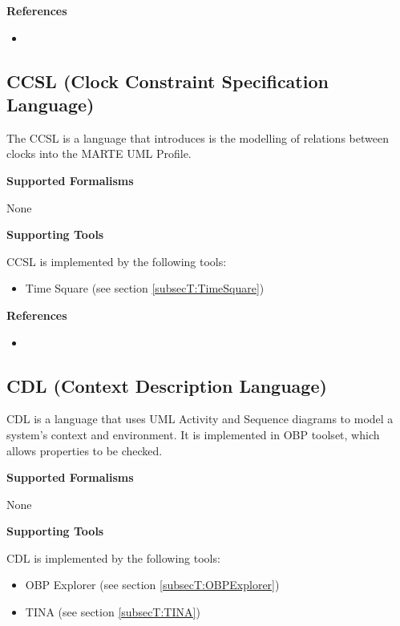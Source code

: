 \textbf{References}
\begin{itemize}
	
\item {}
\end{itemize}



\subsection{CCSL (Clock Constraint Specification Language)}
\label{subsecL:CCSL}


The CCSL is a language that introduces is the modelling of relations between clocks into the MARTE UML Profile.

\textbf{Supported Formalisms}

None


\textbf{Supporting Tools}

CCSL is implemented by the following tools:
\begin{itemize}
	\item Time Square (see section \ref{subsecT:TimeSquare})
\end{itemize}


\textbf{References}
\begin{itemize}
	
\item {}
\end{itemize}



\subsection{CDL (Context Description Language)}
\label{subsecL:CDL}


CDL is a language that uses UML Activity and Sequence diagrams to model a system's context and environment. It is implemented in OBP toolset, which allows properties to be checked.

\textbf{Supported Formalisms}

None


\textbf{Supporting Tools}

CDL is implemented by the following tools:
\begin{itemize}
	\item OBP Explorer (see section \ref{subsecT:OBPExplorer})
	\item TINA (see section \ref{subsecT:TINA})
\end{itemize}


